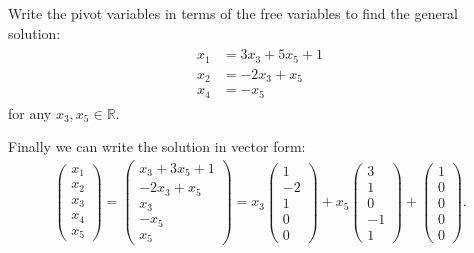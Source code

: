 \documentclass[letterpaper,10pt,english]{jupyterBook}
\begin{document}
\sphinxAtStartPar
Write the pivot variables in terms of the free variables to find the general solution:
\begin{equation*}
\begin{split}
\begin{align*}
x_1 &= 3x_3 + 5x_5 + 1\\
x_2 &= -2x_3 + x_5\\
x_4 &= -x_5
\end{align*}
\end{split}
\end{equation*}
\sphinxAtStartPar
for any \(x_3, x_5 \in \mathbb{R}\).

\sphinxAtStartPar
Finally we can write the solution in vector form:
\begin{equation*}
\begin{split}
\begin{pmatrix}x_1\\x_2\\x_3\\x_4\\x_5\end{pmatrix} = \begin{pmatrix}x_3 +3x_5 + 1\\-2x_3+x_5\\x_3\\-x_5\\x_5\end{pmatrix} = x_3\begin{pmatrix}1\\-2\\1\\0\\0\end{pmatrix} + x_5\begin{pmatrix}3\\1\\0\\-1\\1\end{pmatrix} + \begin{pmatrix}1\\0\\0\\0\\0\end{pmatrix}.
\end{split}
\end{equation*}
\sphinxAtStartPar
\end{document}
